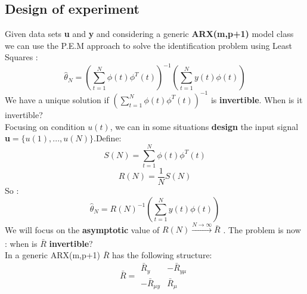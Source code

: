 \subsection{Design of experiment}
Given data sets \textbf{u} and \textbf{y} and considering a generic \textbf{ARX(m,p+1)} model class we can use the P.E.M approach to solve the identification problem using Least Squares :
$$ \hat{\theta}_N = (\sum\limits_{t=1}^{N} \phi(t)\phi^T(t))^{-1}(\sum\limits_{t=1}^{N}y(t)\phi(t))$$ 
We have a unique solution if $(\sum\limits_{t=1}^{N} \phi(t)\phi^T(t))^{-1}$ is \textbf{ invertible}. When is it invertible?\\
Focusing on condition $u(t)$, we can in some situations \textbf{design} the input signal \textbf{u}$=\{u(1),...,u(N)\}$.Define:
$$ S(N) = \sum\limits_{t=1}^{N} \phi(t)\phi^T(t) $$
$$ R(N) = \frac{1}{N}S(N)$$
So :
$$ \hat{\theta}_N = R(N)^{-1}(\sum\limits_{t=1}^{N}y(t)\phi(t))$$ 
We will focus on the \textbf{asymptotic} value of $R(N) \xrightarrow[]{N \to \infty}  \bar{R}$ . The problem is now : when is $\bar{R}$ \textbf{invertible}?\\
In a generic ARX(m,p+1) $\bar{R}$ has the following structure:
$$ \bar{R}= 
\begin{array}{c|c}
  \bar{R}_y & -\bar{R}_{y\mu} \\ 
  \hline
  -\bar{R}_{\mu y} & \bar{R}_{\mu}
 \end{array}$$

